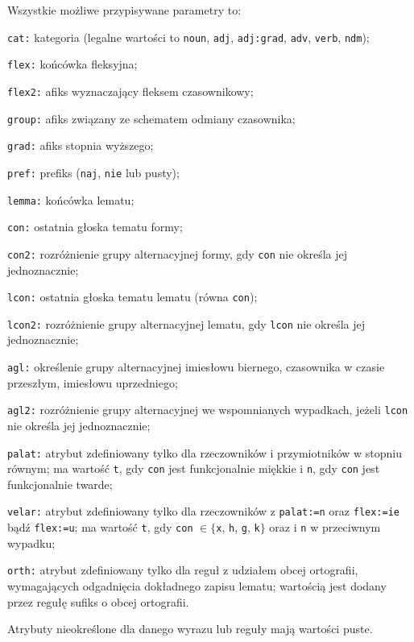 \documentclass{article}
\begin{document}
Wszystkie możliwe przypisywane parametry to:
\begin{description}
\item{\texttt{cat:}} kategoria (legalne wartości to \texttt{noun}, \texttt{adj}, \texttt{adj:grad}, \texttt{adv}, \texttt{verb}, \texttt{ndm});
\item{\texttt{flex:}} końcówka fleksyjna;
\item{\texttt{flex2:}} afiks wyznaczający fleksem czasownikowy;
\item{\texttt{group:}} afiks związany ze schematem odmiany czasownika;
\item{\texttt{grad:}} afiks stopnia wyższego;
\item{\texttt{pref:}} prefiks (\texttt{naj}, \texttt{nie} lub pusty);
\item{\texttt{lemma:}} końcówka lematu;
\item{\texttt{con:}} ostatnia głoska tematu formy;
\item{\texttt{con2:}} rozróżnienie grupy alternacyjnej formy, gdy \texttt{con} nie określa jej jednoznacznie;
\item{\texttt{lcon:}} ostatnia głoska tematu lematu (równa \texttt{con});
\item{\texttt{lcon2:}} rozróżnienie grupy alternacyjnej lematu, gdy \texttt{lcon} nie określa jej jednoznacznie;
\item{\texttt{agl:}} określenie grupy alternacyjnej imiesłowu biernego, czasownika w czasie przeszłym, imiesłowu uprzedniego;
\item{\texttt{agl2:}} rozróżnienie grupy alternacyjnej we wspomnianych wypadkach, jeżeli \texttt{lcon} nie określa jej jednoznacznie;
\item{\texttt{palat:}} atrybut zdefiniowany tylko dla rzeczowników i przymiotników w stopniu równym; ma wartość \texttt{t}, gdy \texttt{con} jest funkcjonalnie miękkie i \texttt{n}, gdy \texttt{con} jest funkcjonalnie twarde;
\item{\texttt{velar:}} atrybut zdefiniowany tylko dla rzeczowników z \texttt{palat:=n} oraz \texttt{flex:=ie} bądź \texttt{flex:=u}; ma wartość \texttt{t}, gdy \texttt{con} $\in \{$\texttt{x}, \texttt{h}, \texttt{g}, \texttt{k}$\}$ oraz i \texttt{n} w przeciwnym wypadku;
\item{\texttt{orth:}} atrybut zdefiniowany tylko dla reguł z udziałem obcej ortografii, wymagających odgadnięcia dokładnego zapisu lematu; wartością jest dodany przez regułę sufiks o obcej ortografii.
\end{description}
Atrybuty nieokreślone dla danego wyrazu lub reguły mają wartości puste.
\end{document}
